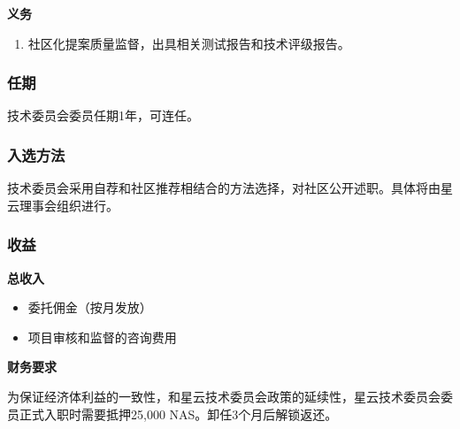 \textbf{义务}

\begin{enumerate}
	\item 社区化提案质量监督，出具相关测试报告和技术评级报告。
\end{enumerate}

\subsubsection{任期}

技术委员会委员任期1年，可连任。

\subsubsection{入选方法}
技术委员会采用自荐和社区推荐相结合的方法选择，对社区公开述职。具体将由星云理事会组织进行。

\subsubsection{收益}
\textbf{总收入}
\begin{itemize}
	\item 委托佣金（按月发放）
	\item 项目审核和监督的咨询费用
\end{itemize}

\textbf{财务要求}

为保证经济体利益的一致性，和星云技术委员会政策的延续性，星云技术委员会委员正式入职时需要抵押25,000 NAS。卸任3个月后解锁返还。